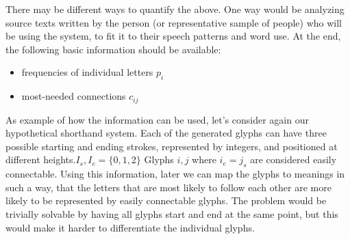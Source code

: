 \documentclass{vgtc}                          %
\begin{document}
There may be different ways to quantify the above. One way would be analyzing source texts written by the person (or representative sample of people) who will be using the system, to fit it to their speech patterns and word use. At the end, the following basic information should be available:

\begin{itemize}
        \item frequencies of individual letters \(p_i\)
        \item most-needed connections \(c_{ij}\)
\end{itemize}

As example of how the information can be used, let's consider again our hypothetical shorthand system. Each of the generated glyphs can have three possible starting and ending strokes, represented by integers, and positioned at different heights.\(I_s, I_e=\{0, 1, 2\}\) Glyphs \(i, j\) where \(i_e=j_s\) are considered easily connectable. Using this information, later we can map the glyphs to meanings in such a way, that the letters that are most likely to follow each other are more likely to be
represented by easily connectable glyphs. The problem would be trivially solvable by having all glyphs start and end at the same point, but this would make it harder to differentiate the individual glyphs.
\end{document}
